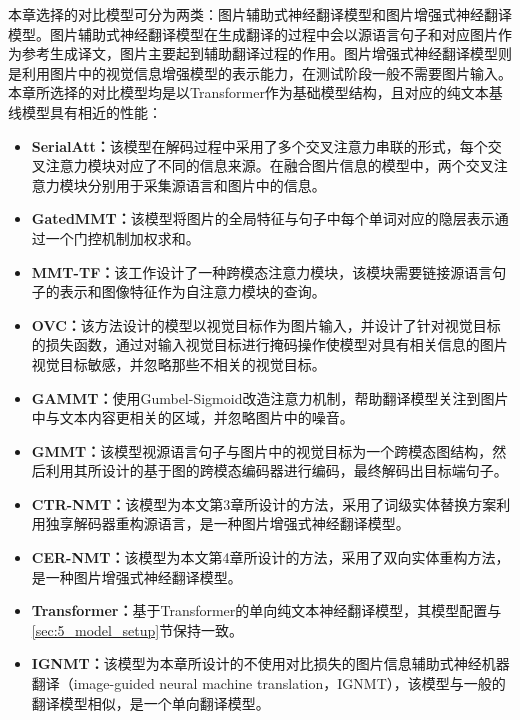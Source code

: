 本章选择的对比模型可分为两类：图片辅助式神经翻译模型和图片增强式神经翻译模型。图片辅助式神经翻译模型在生成翻译的过程中会以源语言句子和对应图片作为参考生成译文，图片主要起到辅助翻译过程的作用。图片增强式神经翻译模型则是利用图片中的视觉信息增强模型的表示能力，在测试阶段一般不需要图片输入。本章所选择的对比模型均是以Transformer作为基础模型结构，且对应的纯文本基线模型具有相近的性能：
\begin{itemize}
    \item \textbf{SerialAtt：}该模型在解码过程中采用了多个交叉注意力串联的形式，每个交叉注意力模块对应了不同的信息来源。在融合图片信息的模型中，两个交叉注意力模块分别用于采集源语言和图片中的信息。
    \item \textbf{GatedMMT：}该模型将图片的全局特征与句子中每个单词对应的隐层表示通过一个门控机制加权求和。
    \item \textbf{MMT-TF：}该工作设计了一种跨模态注意力模块，该模块需要链接源语言句子的表示和图像特征作为自注意力模块的查询。
    \item \textbf{OVC：}该方法设计的模型以视觉目标作为图片输入，并设计了针对视觉目标的损失函数，通过对输入视觉目标进行掩码操作使模型对具有相关信息的图片视觉目标敏感，并忽略那些不相关的视觉目标。
    \item \textbf{GAMMT：}使用Gumbel-Sigmoid改造注意力机制，帮助翻译模型关注到图片中与文本内容更相关的区域，并忽略图片中的噪音。
    \item \textbf{GMMT：}该模型视源语言句子与图片中的视觉目标为一个跨模态图结构，然后利用其所设计的基于图的跨模态编码器进行编码，最终解码出目标端句子。
    \item \textbf{CTR-NMT：}该模型为本文第3章所设计的方法，采用了词级实体替换方案利用独享解码器重构源语言，是一种图片增强式神经翻译模型。
    \item \textbf{CER-NMT：}该模型为本文第4章所设计的方法，采用了双向实体重构方法，是一种图片增强式神经翻译模型。
    \item \textbf{Transformer：}基于Transformer的单向纯文本神经翻译模型，其模型配置与\ref{sec:5_model_setup}节保持一致。
    \item \textbf{IGNMT：}该模型为本章所设计的不使用对比损失的图片信息辅助式神经机器翻译（image-guided neural machine translation，IGNMT），该模型与一般的翻译模型相似，是一个单向翻译模型。
    
\end{itemize}
